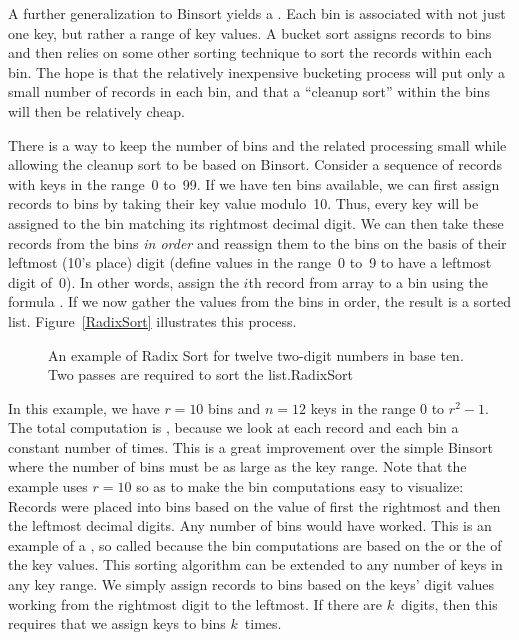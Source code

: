 A further generalization to Binsort yields a .
Each bin is associated with not just one key, but rather a range of
key values.
A bucket sort assigns records to bins and then relies on some
other sorting technique to sort the records within each bin.  The hope
is that the relatively inexpensive bucketing process will put only a
small number of records in each bin, and that a
``cleanup sort'' within the bins will then be relatively cheap.

There is a way to keep the number of bins and the related processing
small while allowing the cleanup sort to be based on Binsort.
Consider a sequence of records with keys in the range~0 to~99.
If we have ten bins available, we can first assign records to bins by
taking their key value modulo~10.
Thus, every key will be assigned to the
bin matching its rightmost decimal digit.
We can then take these
records from the bins \emph{in order} and reassign them to the bins
on the basis of their leftmost (10's place) digit (define values in
the range~0 to~9 to have a leftmost digit of~0).
In other words, assign the \(i\)th record from array  to a bin
using the formula .
If we now gather the values from
the bins in order, the result is a sorted list.
Figure~\ref{RadixSort} illustrates this process.

\begin{figure}
\vspace{-\bigskipamount}\vspace{-\medskipamount}

{An example of Radix Sort
for twelve two-digit numbers in base ten.
Two passes are required to sort the list.}{RadixSort}
\vspace{-1pt}
\end{figure}

\newpage

In this example, we have \(r=10\) bins and \(n=12\) keys in the range
0 to \(r^2-1\).
The total computation is \Thetan, because we look at each
record and each bin a constant number of times.
This is a great improvement over the simple Binsort where the number
of bins must be as large as the key range.
Note that the example uses \(r = 10\) so as
to make the bin computations easy to visualize:
Records were placed
into bins based on the value of first the rightmost and then the
leftmost decimal digits.
Any number of bins would have worked.
This is an example of a , so called because the bin
computations are based on the  or the  of the
key values.
This sorting algorithm can be extended to any number of
keys in any key range.
We simply assign records to bins based on the
keys' digit values working from the rightmost digit to the leftmost.
If there are \(k\)~digits, then this requires that we assign keys to
bins \(k\)~times.

